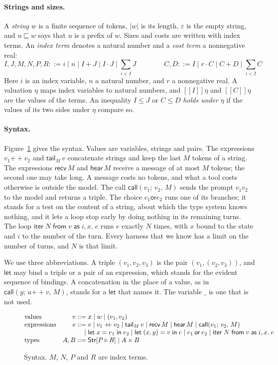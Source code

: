 \documentclass[acmsmall,nonacm,screen]{acmart}
\newcommand{\kw}[1]{\mathsf{#1}}
\newcommand{\Str}[2]{\kw{Str}[#1 \triangleright #2]}
\newcommand{\cat}{\mathbin{+\!\!+}}
\newcommand{\recv}[1]{\kw{recv}\,#1}
\newcommand{\hear}[1]{\kw{hear}\,#1}
\newcommand{\tail}[2]{\kw{tail}_{#1}\,#2}
\newcommand{\call}[3]{\kw{call}(#1;\,#2,\,#3)}
\newcommand{\letin}[2]{\kw{let}\;#1 = #2\;\kw{in}}
\newcommand{\iter}[4]{\kw{iter}\;#1\;\kw{from}\;#2\;\kw{as}\;#3.\;#4}
\newcommand{\orr}{\mathbin{\kw{or}}}
\newcommand{\sem}[1]{[\![#1]\!]}
\newcommand{\pre}{\sqsubseteq}
\newcommand{\eps}{\varepsilon}
\newcommand{\tsum}{\textstyle\sum}
\begin{document}
\paragraph{Strings and sizes.} A \emph{string} $w$ is a finite sequence of tokens, $|w|$ is
its length, $\eps$ is the empty string, and $u \pre w$ says that $u$ is a prefix of $w$. Sizes
and costs are written with index terms. An \emph{index term} denotes a natural number and a
\emph{cost term} a nonnegative real:
\[
I, J, M, N, P, R ::= i \mid n \mid I + J \mid I \cdot J \mid \tsum_{i<I} J
\qquad\qquad
C, D ::= I \mid r \cdot C \mid C + D \mid \tsum_{i<I} C
\]
Here $i$ is an index variable, $n$ a natural number, and $r$ a nonnegative real. A valuation
$\eta$ maps index variables to natural numbers, and $\sem{I}\eta$ and $\sem{C}\eta$ are the
values of the terms. An inequality $I \le J$ or $C \le D$ \emph{holds under} $\eta$ if
the values of its two sides under $\eta$ compare so.

\paragraph{Syntax.} Figure~\ref{fig:syntax} gives the syntax. Values are variables, strings and
pairs. The expressions $v_1 \cat v_2$ and $\tail{M}{v}$ concatenate strings and keep the last
$M$ tokens of a string. The expressions $\recv{M}$ and $\hear{M}$ receive a message of at most
$M$ tokens; the second one may take long. A message costs no tokens, and what a tool costs
otherwise is outside the model. The call $\call{v_1}{v_2}{M}$ sends the prompt
$v_1v_2$ to the model and returns a triple. The choice $e_1 \orr e_2$ runs one of its branches;
it stands for a test on the content of a string, about which the type system knows nothing,
and it lets a loop stop early by doing nothing in its remaining turns. The loop
$\iter{N}{v}{i,x}{e}$ runs $e$ exactly $N$ times, with $x$ bound to the state and $i$ to the
number of the turn. Every harness that we know has a limit on the number of turns, and $N$ is
that limit.

We use three abbreviations. A triple $(v_1, v_2, v_3)$ is the pair $(v_1, (v_2, v_3))$, and
$\kw{let}$ may bind a triple or a pair of an expression, which stands for the evident sequence
of bindings. A concatenation in the place of a value, as in $\call{y}{u \cat v}{M}$, stands for
a $\kw{let}$ that names it. The variable $\_$ is one that is not used.

\begin{figure}[t]
\[
\begin{array}{@{}l@{\quad}r@{\;}l@{}}
\text{values} & v ::= & x \mid w \mid (v_1, v_2) \\
\text{expressions} & e ::= & v \mid v_1 \cat v_2 \mid \tail{M}{v} \mid \recv{M} \mid \hear{M}
  \mid \call{v_1}{v_2}{M} \\
 & \mid & \letin{x}{e_1}\; e_2 \mid \letin{(x, y)}{v}\; e \mid e_1 \orr e_2
  \mid \iter{N}{v}{i, x}{e} \\
\text{types} & A, B ::= & \Str{P}{R} \mid A \times B
\end{array}
\]
\caption{Syntax. $M$, $N$, $P$ and $R$ are index terms.}
\label{fig:syntax}
\end{figure}
\end{document}
